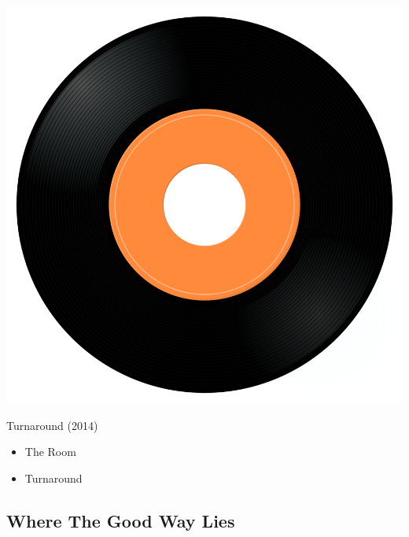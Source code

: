 \begin{minipage}[t]{0.25\textwidth}
\captionsetup{type=figure}
\includegraphics[width=\textwidth]{Images/cover.png}
\caption*{Turnaround (2014)}
\end{minipage}
\begin{minipage}[t]{0.25\textwidth}\vspace{0pt}
\begin{itemize}[nosep,leftmargin=1em,labelwidth=*,align=left]
	\setlength{\itemsep}{0pt}
	\item The Room
	\item Turnaround
\end{itemize}
\end{minipage}

\subsection{Where The Good Way Lies}

